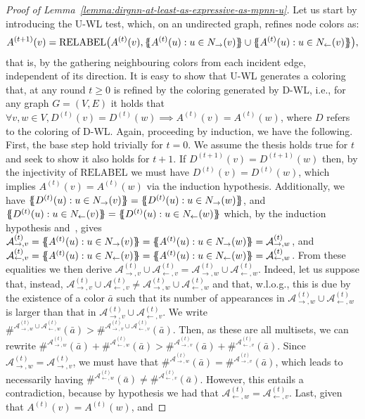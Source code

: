 \documentclass{article}
\newcommand{\inp}{\leftarrow}
\newcommand{\out}{\rightarrow}
\newcommand*{\ldblbrace}{\{\mskip-6mu\{}
\newcommand*{\rdblbrace}{\}\mskip-6mu\}}
\theoremstyle{plain}
\theoremstyle{definition}
\theoremstyle{remark}
\begin{document}
\begin{proof}[Proof of Lemma~\ref{lemma:dirgnn-at-least-as-expressive-as-mpnn-u}]
    Let us start by introducing the U-WL test, which, on an undirected graph, refines node colors as:
    $$  
        A^{(t+1)}(v) = \textrm{RELABEL} \big ( A^{(t)}(v), \ldblbrace  A^{(t)}(u) : u \in N_{\out}(v) \rdblbrace \cup \ldblbrace  A^{(t)}(u) : u \in N_{\inp}(v) \rdblbrace \big ),
    $$
    that is, by the gathering neighbouring colors from each incident edge, independent of its direction. It is easy to show that U-WL generates a coloring that, at any round $t \geq 0$ is refined by the coloring generated by D-WL, i.e., for any graph $G = (V, E)$ it holds that $\forall v, w \in V, D^{(t)}(v) = D^{(t)}(w) \implies A^{(t)}(v) = A^{(t)}(w)$, where $D$ refers to the coloring of D-WL. Again, proceeding by induction, we have the following. First, the base step hold trivially for $t = 0$. We assume the thesis holds true for $t$ and seek to show it also holds for $t+1$. If $D^{(t+1)}(v) = D^{(t+1)}(w)$ then, by the injectivity of $\textrm{RELABEL}$ we must have $D^{(t)}(v) = D^{(t)}(w)$, which implies $A^{(t)}(v) = A^{(t)}(w)$ via the induction hypothesis. Additionally, we have $\ldblbrace D^{(t)}(u) : u \in N_\out(v) \rdblbrace = \ldblbrace D^{(t)}(u) : u \in N_\out(w) \rdblbrace$, and $\ldblbrace D^{(t)}(u) : u \in N_\inp(v) \rdblbrace = \ldblbrace D^{(t)}(u) : u \in N_\inp(w) \rdblbrace$ which, by the induction hypothesis and~\citep[Lemma 2]{bevilacqua2022equivariant}, gives $\mathcal{A}^{(t)}_{\out, v} = \ldblbrace A^{(t)}(u) : u \in N_\out(v) \rdblbrace = \ldblbrace A^{(t)}(u) : u \in N_\out(w) \rdblbrace = \mathcal{A}^{(t)}_{\out,w}$, and $\mathcal{A}^{(t)}_{\inp, v} = \ldblbrace A^{(t)}(u) : u \in N_\inp(v) \rdblbrace = \ldblbrace A^{(t)}(u) : u \in N_\inp(w) \rdblbrace = \mathcal{A}^{(t)}_{\inp,w}$. From these equalities we then derive $\mathcal{A}^{(t)}_{\out,v} \cup \mathcal{A}^{(t)}_{\inp,v} = \mathcal{A}^{(t)}_{\out,w} \cup \mathcal{A}^{(t)}_{\inp,w}$. Indeed, let us suppose that, instead, $\mathcal{A}^{(t)}_{\out,v} \cup \mathcal{A}^{(t)}_{\inp,v} \neq \mathcal{A}^{(t)}_{\out,w} \cup \mathcal{A}^{(t)}_{\inp,w}$ and that, w.l.o.g., this is due by the existence of a color $\bar{a}$ such that its number of appearances in $\mathcal{A}^{(t)}_{\out,w} \cup \mathcal{A}^{(t)}_{\inp,w}$ is larger than that in $\mathcal{A}^{(t)}_{\out,v} \cup \mathcal{A}^{(t)}_{\inp,v}$. We write $\#^{\mathcal{A}^{(t)}_{\out,w} \cup \mathcal{A}^{(t)}_{\inp,w}}(\bar{a}) > \#^{\mathcal{A}^{(t)}_{\out,v} \cup \mathcal{A}^{(t)}_{\inp,v}}(\bar{a})$. Then, as these are all multisets, we can rewrite $\#^{\mathcal{A}^{(t)}_{\out,w}}(\bar{a}) + \#^{\mathcal{A}^{(t)}_{\inp,w}}(\bar{a}) > \#^{\mathcal{A}^{(t)}_{\out,v}}(\bar{a}) + \#^{\mathcal{A}^{(t)}_{\inp,v}}(\bar{a})$. Since $\mathcal{A}^{(t)}_{\out,w} = \mathcal{A}^{(t)}_{\out,v}$, we must have that $\#^{\mathcal{A}^{(t)}_{\out,w}}(\bar{a}) = \#^{\mathcal{A}^{(t)}_{\out,v}}(\bar{a})$, which leads to necessarily having $\#^{\mathcal{A}^{(t)}_{\inp,w}}(\bar{a}) \neq \#^{\mathcal{A}^{(t)}_{\inp,v}}(\bar{a})$. However, this entails a contradiction, because by hypothesis we had that $\mathcal{A}^{(t)}_{\inp,w} = \mathcal{A}^{(t)}_{\inp,v}$. Last, given that $A^{(t)}(v) = A^{(t)}(w)$, and 
\end{proof}
\end{document}

